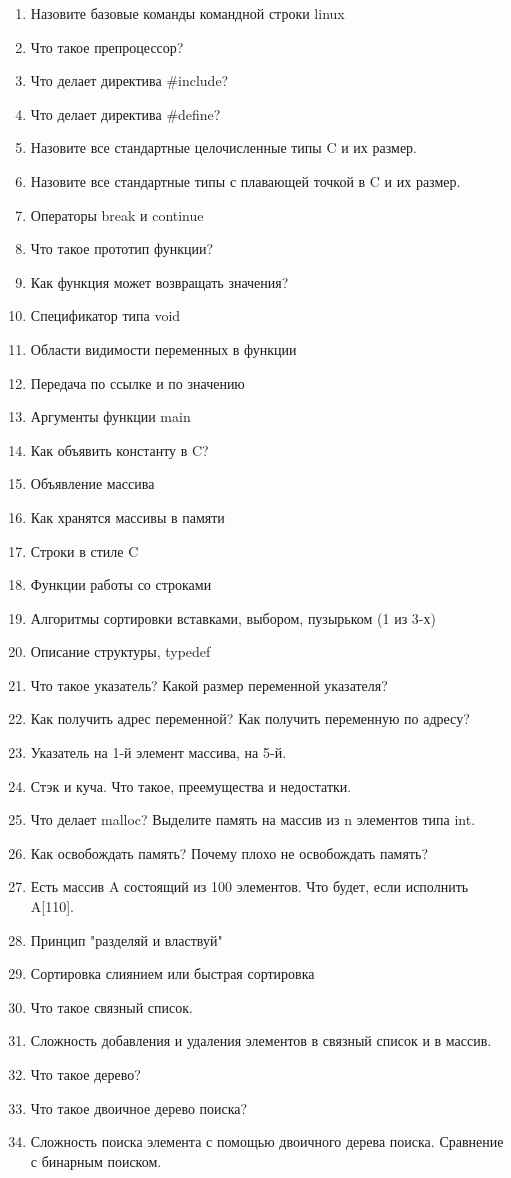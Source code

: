 \documentclass{article}
\begin{document}
\begin{enumerate}

\item Назовите базовые команды командной строки linux
\item Что такое препроцессор?
\item Что делает директива \#include?
\item Что делает директива \#define?
\item Назовите все стандартные целочисленные типы C и их размер.
\item Назовите все стандартные типы с плавающей точкой в C и их размер.
\item Операторы break и continue
\item Что такое прототип функции?
\item Как функция может возвращать значения?
\item Спецификатор типа void
\item Области видимости переменных в функции
\item Передача по ссылке и по значению
\item Аргументы функции main
\item Как объявить константу в C?
\item Объявление массива
\item Как хранятся массивы в памяти
\item Строки в стиле C
\item Функции работы со строками
\item Алгоритмы сортировки вставками, выбором, пузырьком (1 из 3-х)
\item Описание структуры, typedef
\item Что такое указатель? Какой размер переменной указателя? 
\item Как получить адрес переменной? Как получить переменную по адресу?
\item Указатель на 1-й элемент массива, на 5-й.
\item Стэк и куча. Что такое, преемущества и недостатки.
\item Что делает malloc? Выделите память на массив из n элементов типа int.
\item Как освобождать память? Почему плохо не освобождать память?
\item Есть массив A состоящий из 100 элементов. Что будет, если исполнить A[110].
\item Принцип "разделяй и властвуй"
\item Сортировка слиянием или быстрая сортировка
\item Что такое связный список.
\item Сложность добавления и удаления элементов в связный список и в массив.
\item Что такое дерево?
\item Что такое двоичное дерево поиска? 
\item Сложность поиска элемента с помощью двоичного дерева поиска. Сравнение с бинарным поиском.
\end{enumerate}

\fi
\end{document}
